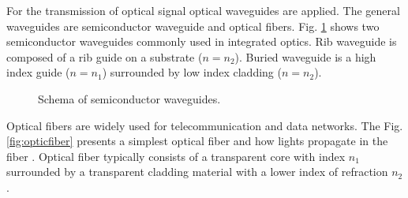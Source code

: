 For the transmission of optical signal optical waveguides are applied. The general waveguides are semiconductor waveguide and optical fibers. 
Fig. \ref{fig:semi_waveguides} shows two semiconductor waveguides commonly used in integrated optics. Rib waveguide is composed of a rib guide on a substrate ($n=n_{2}$). Buried waveguide is a high index guide ($n=n_{1}$) surrounded by low index cladding ($n=n_{2}$).\\

\begin{figure}[!ht]
\centering
{}
\hfill
{}
\caption{Schema of semiconductor waveguides.}
\label{fig:semi_waveguides}
\end{figure}
Optical fibers are widely used for telecommunication and data networks. The Fig.\ref{fig:opticfiber} presents a simplest optical fiber and how lights propagate in the fiber . Optical fiber typically consists of a transparent core with index $n_{1}$ surrounded by a transparent cladding material with a lower index of refraction $n_{2}$.\\
 
